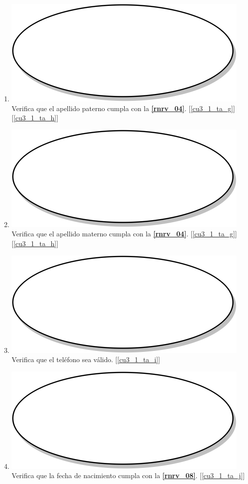 \begin{enumerate}
  \item {\includegraphics[scale=.05]{Capitulo3/img/proceso.png} Verifica que el apellido paterno cumpla con la \textbf{\ref{rnrv_04}}. [\ref{cu3_1_ta_g}] [\ref{cu3_1_ta_h}]}
  \item {\includegraphics[scale=.05]{Capitulo3/img/proceso.png} Verifica que el apellido materno cumpla con la \textbf{\ref{rnrv_04}}. [\ref{cu3_1_ta_g}] [\ref{cu3_1_ta_h}]}
  \item {\includegraphics[scale=.05]{Capitulo3/img/proceso.png} Verifica que el teléfono sea válido. [\ref{cu3_1_ta_i}]}
  \item {\includegraphics[scale=.05]{Capitulo3/img/proceso.png} Verifica que la fecha de nacimiento cumpla con la \textbf{\ref{rnrv_08}}. [\ref{cu3_1_ta_j}]}

\end{enumerate}
